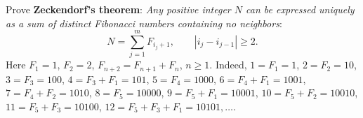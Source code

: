 Prove \textbf{Zeckendorf's theorem}: \emph{Any positive integer $N$ can be expressed uniquely as a sum of distinct Fibonacci numbers containing no neighbors}:
\[ N = \sum_{j=1}^m F_{i_j+1},\qquad |i_j - i_{j-1}| \geq 2. \]
Here $F_1 = 1$, $F_2 = 2$, $F_{n+2} = F_{n+1} + F_n$, $n \geq 1$. Indeed, $1 = F_1 = 1$, $2 = F_2 = 10$, $3 = F_3 = 100$, $4 = F_3 + F_1 = 101$, $5 = F_4 = 1000$, $6 = F_4 + F_1 = 1001$, $7 = F_4 + F_2 = 1010$, $8 = F_5 = 10000$, $9 = F_5 + F_1 = 10001$, $10 = F_5 + F_2 = 10010$, $11 = F_5 + F_3 = 10100$, $12 = F_5 + F_3 + F_1 = 10101, \ldots$.
